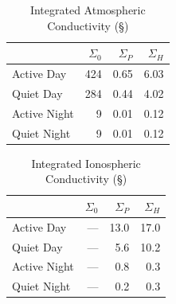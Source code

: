 \begin{longtable}{ @{\extracolsep{\fill}} lrrr @{\extracolsep{\fill}} }
  \caption[Integrated Atmospheric Conductivity]{Integrated Atmospheric Conductivity (\si{\S})}
  \label{tab_sigma_atm} \\

  \toprule
  &
  $\Sigma_0$ &
  $\Sigma_P$ &
  $\Sigma_H$ \\
  \midrule
  \endfirsthead

  \bottomrule
  \endlastfoot

  Active Day &
  424 &
  0.65 &
  6.03 \\

  Quiet Day &
  284 &
  0.44 &
  4.02 \\

  Active Night &
  9 &
  0.01 &
  0.12 \\

  Quiet Night &
  9 &
  0.01 &
  0.12 \\

\end{longtable}

\begin{longtable}{ @{\extracolsep{\fill}} lrrr @{\extracolsep{\fill}} }
  \caption[Integrated Ionospheric Conductivity]{Integrated Ionospheric Conductivity (\si{\S})}
  \label{tab_sigma_ionos} \\

  \toprule
  &
  $\Sigma_0$ &
  $\Sigma_P$ &
  $\Sigma_H$ \\
  \midrule
  \endfirsthead

  \bottomrule
  \endlastfoot

  Active Day &
  --- &
  13.0 &
  17.0 \\

  Quiet Day &
  --- &
  5.6 &
  10.2 \\

  Active Night &
  --- &
  0.8 &
  0.3 \\

  Quiet Night &
  --- &
  0.2 &
  0.3 \\

\end{longtable}




